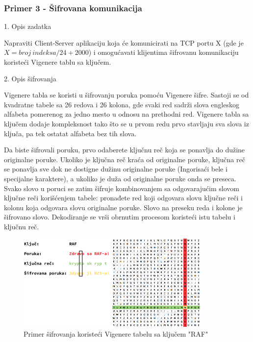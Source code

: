 \subsubsection{Primer 3 - Šifrovana komunikacija}

\large{1. Opis zadatka}
\normalsize

Napraviti Client-Server aplikaciju koja će komunicirati na TCP portu X (gde je $X = broj\ indeksa/24 + 2000$) i omogućavati klijentima šifrovanu komunikaciju koristeći Vigenere tablu sa ključem.

\large{2. Opis šifrovanja}
\normalsize

Vigenere tabla se koristi u šifrovanju poruka pomoću Vigenere šifre. Sastoji se od kvadratne tabele sa 26 redova i 26 kolona, gde svaki red sadrži slova engleskog alfabeta pomerenog za jedno mesto u odnosu na prethodni red. Vigenere tabla sa ključem dodaje kompleksnost tako što se u prvom redu prvo stavljaju sva slova iz ključa, pa tek ostatat alfabeta bez tih slova. 

Da biste šifrovali poruku, prvo odaberete ključnu reč koja se ponavlja do dužine originalne poruke. Ukoliko je ključna reč kraća od originalne poruke, ključna reč se ponavlja sve dok ne dostigne dužinu originalne poruke (Ingorisaći bele i specijalne karaktere), a ukoliko je duža od originalne poruke onda se preseca. Svako slovo u poruci se zatim šifruje kombinovanjem sa odgovarajućim slovom ključne reči korišćenjem tabele: pronađete red koji odgovara slovu ključne reči i kolonu koja odgovara slovu originalne poruke. Slovo na preseku reda i kolone je šifrovano slovo. Dekodiranje se vrši obrnutim procesom koristeći istu tabelu i ključnu reč.

\begin{figure}[H]
    \centering
    \includegraphics[width=0.85\textwidth]{Slike/VTB/VTB_Sifrovanje.png}
    \caption*{Primer šifrovanja koristeći Vigenere tabelu sa ključem "RAF"}
    \label{fig:vtb_primer}
\end{figure}

